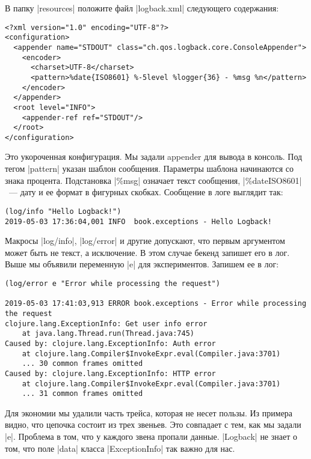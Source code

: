 \noindent
В папку \spverb|resources| положите файл \spverb|logback.xml| следующего содержания:

\begin{verbatim}
<?xml version="1.0" encoding="UTF-8"?>
<configuration>
  <appender name="STDOUT" class="ch.qos.logback.core.ConsoleAppender">
    <encoder>
      <charset>UTF-8</charset>
      <pattern>%date{ISO8601} %-5level %logger{36} - %msg %n</pattern>
    </encoder>
  </appender>
  <root level="INFO">
    <appender-ref ref="STDOUT"/>
  </root>
</configuration>
\end{verbatim}

Это укороченная конфигурация. Мы задали appender для вывода в консоль. Под тегом
\spverb|pattern| указан шаблон сообщения. Параметры шаблона начинаются со знака
процента. Подстановка \spverb|\%msg| означает текст сообщения,
\spverb|\%date{ISO8601}|~--- дату и ее формат в фигурных скобках. Сообщение в
логе выглядит так:

\begin{verbatim}
(log/info "Hello Logback!")
2019-05-03 17:36:04,001 INFO  book.exceptions - Hello Logback!
\end{verbatim}

Макросы \spverb|log/info|, \spverb|log/error| и другие допускают, что первым
аргументом может быть не текст, а исключение. В этом случае бекенд запишет его в
лог. Выше мы объявили переменную \spverb|e| для экспериментов. Запишем ее в лог:

\begin{verbatim}
(log/error e "Error while processing the request")

2019-05-03 17:41:03,913 ERROR book.exceptions - Error while processing the request
clojure.lang.ExceptionInfo: Get user info error
    at java.lang.Thread.run(Thread.java:745)
Caused by: clojure.lang.ExceptionInfo: Auth error
    at clojure.lang.Compiler$InvokeExpr.eval(Compiler.java:3701)
    ... 30 common frames omitted
Caused by: clojure.lang.ExceptionInfo: HTTP error
    at clojure.lang.Compiler$InvokeExpr.eval(Compiler.java:3701)
    ... 31 common frames omitted
\end{verbatim} 

Для экономии мы удалили часть трейса, которая не несет пользы. Из примера видно,
что цепочка состоит из трех звеньев. Это совпадает с тем, как мы задали
\spverb|e|. Проблема в том, что у каждого звена пропали данные. \spverb|Logback|
не знает о том, что поле \spverb|data| класса \spverb|ExceptionInfo| так важно
для нас.

